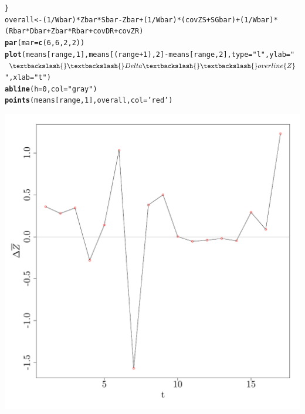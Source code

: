 \documentclass{article}\usepackage[]{graphicx}\usepackage[]{color}
\makeatletter
\def\maxwidth{ %
  \ifdim\Gin@nat@width>\linewidth
    \linewidth
  \else
    \Gin@nat@width
  \fi
}
\newcommand{\hlnum}[1]{\textcolor[rgb]{0.686,0.059,0.569}{#1}}%
\newcommand{\hlstr}[1]{\textcolor[rgb]{0.192,0.494,0.8}{#1}}%
\newcommand{\hlopt}[1]{\textcolor[rgb]{0,0,0}{#1}}%
\newcommand{\hlstd}[1]{\textcolor[rgb]{0.345,0.345,0.345}{#1}}%
\newcommand{\hlkwb}[1]{\textcolor[rgb]{0.69,0.353,0.396}{#1}}%
\newcommand{\hlkwc}[1]{\textcolor[rgb]{0.333,0.667,0.333}{#1}}%
\newcommand{\hlkwd}[1]{\textcolor[rgb]{0.737,0.353,0.396}{\textbf{#1}}}%
\newenvironment{kframe}{%
 \def\at@end@of@kframe{}%
 \ifinner\ifhmode%
  \def\at@end@of@kframe{\end{minipage}}%
  \begin{minipage}{\columnwidth}%
 \fi\fi%
 \def\FrameCommand##1{\hskip\@totalleftmargin \hskip-\fboxsep
 \colorbox{shadecolor}{##1}\hskip-\fboxsep
     \hskip-\linewidth \hskip-\@totalleftmargin \hskip\columnwidth}%
 \MakeFramed {\advance\hsize-\width
   \@totalleftmargin\z@ \linewidth\hsize
   \@setminipage}}%
 {\par\unskip\endMakeFramed%
 \at@end@of@kframe}
\newenvironment{knitrout}{}{} %
\makeatother
\begin{document}
\begin{knitrout}
\begin{kframe}
\begin{alltt}
\hlstd{\}}
\hlstd{overall}\hlkwb{<-}\hlstd{(}\hlnum{1}\hlopt{/}\hlstd{Wbar)}\hlopt{*}\hlstd{Zbar}\hlopt{*}\hlstd{Sbar}\hlopt{-}\hlstd{Zbar}\hlopt{+}\hlstd{(}\hlnum{1}\hlopt{/}\hlstd{Wbar)}\hlopt{*}\hlstd{(covZS}\hlopt{+}\hlstd{SGbar)}\hlopt{+}\hlstd{(}\hlnum{1}\hlopt{/}\hlstd{Wbar)}\hlopt{*}\hlstd{(Rbar}\hlopt{*}\hlstd{Dbar}\hlopt{+}\hlstd{Zbar}\hlopt{*}\hlstd{Rbar}\hlopt{+}\hlstd{covDR}\hlopt{+}\hlstd{covZR)}
\hlkwd{par}\hlstd{(}\hlkwc{mar}\hlstd{=}\hlkwd{c}\hlstd{(}\hlnum{6}\hlstd{,}\hlnum{6}\hlstd{,}\hlnum{2}\hlstd{,}\hlnum{2}\hlstd{))}
\hlkwd{plot}\hlstd{(means[range,}\hlnum{1}\hlstd{],means[(range}\hlopt{+}\hlnum{1}\hlstd{),}\hlnum{2}\hlstd{]}\hlopt{-}\hlstd{means[range,}\hlnum{2}\hlstd{],}\hlkwc{type}\hlstd{=}\hlstr{"l"}\hlstd{,}\hlkwc{ylab}\hlstd{=}\hlstr{"$\textbackslash{}\textbackslash{}Delta \textbackslash{}\textbackslash{}overline\{Z\}$"}\hlstd{,}\hlkwc{xlab}\hlstd{=}\hlstr{"t"}\hlstd{)}
\hlkwd{abline}\hlstd{(}\hlkwc{h}\hlstd{=}\hlnum{0}\hlstd{,}\hlkwc{col}\hlstd{=}\hlstr{"gray"}\hlstd{)}
\hlkwd{points}\hlstd{(means[range,}\hlnum{1}\hlstd{],overall,}\hlkwc{col}\hlstd{=}\hlstr{'red'}\hlstd{)}
\end{alltt}
\end{kframe}
\includegraphics[width=\maxwidth]{figure/decompose_that_stuff} 

\end{knitrout}
\end{document}
